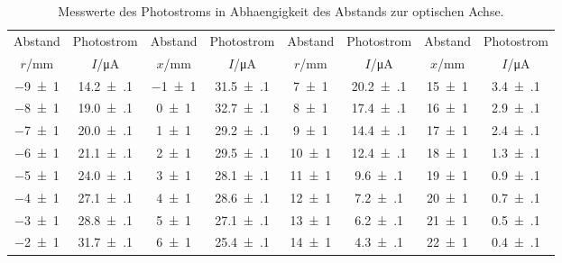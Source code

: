 \begin{table}[!h]
	\centering
	\begin{adjustbox}{width=1\textwidth}
	\begin{tabular}{cccccccc}
		\toprule
		Abstand & Photostrom & Abstand & Photostrom & Abstand & Photostrom & Abstand & Photostrom\\
		$r$/\si{mm} & $I$/\si{\micro\ampere} & $x$/\si{mm} & $I$/\si{\micro\ampere} & $r$/\si{mm} & $I$/\si{\micro\ampere} & $x$/\si{mm} & $I$/\si{\micro\ampere}\\
\midrule
		\num{-9(1)} & \num{14.2(1)} & \num{-1(1)} & \num{31.5(1)} & \num{7(1)} & \num{20.2(1)} & \num{15(1)} & \num{3.4(1)}\\
		\num{-8(1)} & \num{19.0(1)} & \num{0(1)} & \num{32.7(1)} & \num{8(1)} & \num{17.4(1)} & \num{16(1)} & \num{2.9(1)}\\
		\num{-7(1)} & \num{20.0(1)} & \num{1(1)} & \num{29.2(1)} & \num{9(1)} & \num{14.4(1)} & \num{17(1)} & \num{2.4(1)}\\
		\num{-6(1)} & \num{21.1(1)} & \num{2(1)} & \num{29.5(1)} & \num{10(1)} & \num{12.4(1)} & \num{18(1)} & \num{1.3(1)}\\
		\num{-5(1)} & \num{24.0(1)} & \num{3(1)} & \num{28.1(1)} & \num{11(1)} & \num{9.6(1)} & \num{19(1)} & \num{0.9(1)}\\
		\num{-4(1)} & \num{27.1(1)} & \num{4(1)} & \num{28.6(1)} & \num{12(1)} & \num{7.2(1)} & \num{20(1)} & \num{0.7(1)}\\
		\num{-3(1)} & \num{28.8(1)} & \num{5(1)} & \num{27.1(1)} & \num{13(1)} & \num{6.2(1)} & \num{21(1)} & \num{0.5(1)}\\
		\num{-2(1)} & \num{31.7(1)} & \num{6(1)} & \num{25.4(1)} & \num{14(1)} & \num{4.3(1)} & \num{22(1)} & \num{0.4(1)}\\
		\bottomrule
	\end{tabular}
	\end{adjustbox}
	\caption{Messwerte des Photostroms in Abhaengigkeit des Abstands zur optischen Achse. \label{tab:TEM00}}
	
\end{table}
